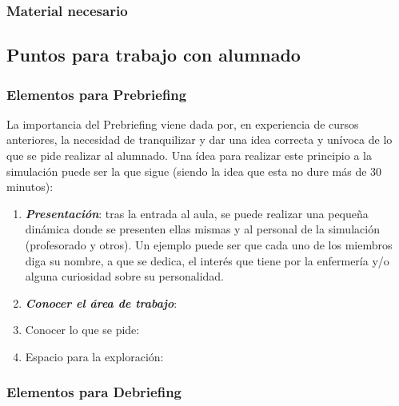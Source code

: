 \subsubsection{Material necesario}
\subsection{Puntos para trabajo con alumnado}
\subsubsection{Elementos para Prebriefing}
La importancia del Prebriefing viene dada por, en experiencia de cursos anteriores, la necesidad de tranquilizar y dar una idea correcta y unívoca de lo que se pide realizar al alumnado. Una ídea para realizar este principio a la simulación puede ser la que sigue (siendo la idea que esta no dure más de 30 minutos):
\begin{enumerate}[topsep=0pt, partopsep=0pt,itemsep=0pt,parsep=0pt]
    \item \textbf{\textit{Presentación}}: tras la entrada al aula, se puede realizar una pequeña dinámica donde se presenten ellas mismas y al personal de la simulación (profesorado y otros). Un ejemplo puede ser que cada uno de los miembros diga su nombre, a que se dedica, el interés que tiene por la enfermería y/o alguna curiosidad sobre su personalidad.
    \item \textbf{\textit{Conocer el área de trabajo}}:
    \item Conocer lo que se pide:
    \item Espacio para la exploración:
\end{enumerate}
\subsubsection{Elementos para Debriefing}




